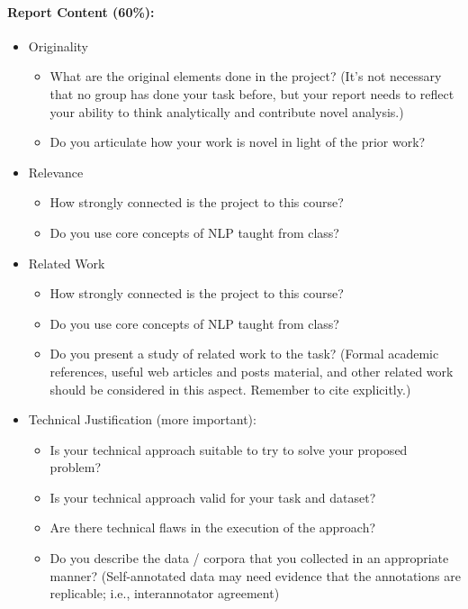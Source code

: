 \documentclass[11pt]{article}
\begin{document}
\paragraph{Report Content (60\%):}

\begin{itemize}
    \item Originality 
    \begin{itemize}
        \item What are the original elements done in the project? (It’s not necessary that no group has done your task before, but your report needs to reflect your ability to think analytically and contribute novel analysis.)
        \item Do you articulate how your work is novel in light of the prior work?
    \end{itemize}
    \item Relevance 
    \begin{itemize}
        \item How strongly connected is the project to this course? 
        \item Do you use core concepts of NLP taught from class?
    \end{itemize}
    \item Related Work
    \begin{itemize}
        \item How strongly connected is the project to this course? 
        \item Do you use core concepts of NLP taught from class?
        \item Do you present a study of related work to the task? (Formal academic references, useful web articles and posts material, and other related work should be considered in this aspect. Remember to cite explicitly.)
    \end{itemize}
    \item Technical Justification (more important): 
    \begin{itemize}
        \item Is your technical approach suitable to try to solve your proposed problem? 
        \item Is your technical approach valid for your task and dataset? 
        \item Are there technical flaws in the execution of the approach? 
        \item Do you describe the data / corpora that you collected in an appropriate manner? (Self-annotated data may need evidence that the annotations are replicable; i.e., interannotator agreement)  
        

\end{itemize}
\end{itemize}
\end{document}
